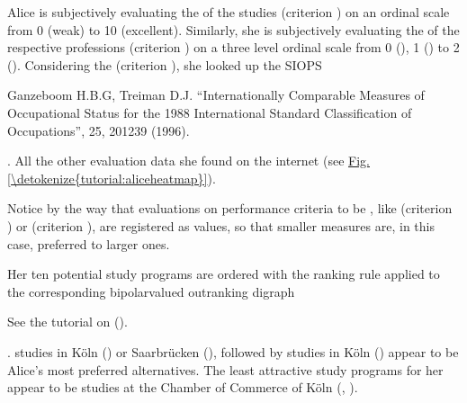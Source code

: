 \documentclass[a4paper,12pt,english]{sphinxhowto}
\begin{document}
Alice is subjectively evaluating the  of the studies (criterion ) on an ordinal scale from 0 (weak) to 10 (excellent). Similarly, she is subjectively evaluating the  of the respective professions (criterion ) on a three level ordinal scale from 0 (), 1 () to 2 (). Considering the  (criterion ), she looked up the SIOPS %
\begin{footnote}[20]\sphinxAtStartFootnote
Ganzeboom H.B.G, Treiman D.J. “Internationally Comparable Measures of Occupational Status for the 1988 International Standard Classification of Occupations”,  25, 201\textendash{}239 (1996).
%
\end{footnote}. All the other evaluation data she found on the internet (see \hyperref[\detokenize{tutorial:aliceheatmap}]{Fig.\@ \ref{\detokenize{tutorial:aliceheatmap}}}).

Notice by the way that evaluations on performance criteria to be , like  (criterion ) or  (criterion ), are registered as  values, so that smaller measures are, in this case, preferred to larger ones.

Her ten potential study programs are ordered with the  ranking rule applied to the corresponding bipolar\sphinxhyphen{}valued outranking digraph %
\begin{footnote}[23]\sphinxAtStartFootnote
See the tutorial on {\hyperref[\detokenize{tutorial:ranking-tutorial-label}]{}} ().
%
\end{footnote}.  studies in Köln () or Saarbrücken (), followed by  studies in Köln () appear to be Alice’s most preferred alternatives. The least attractive study programs for her appear to be studies at the Chamber of Commerce of Köln (, ).
\end{document}
